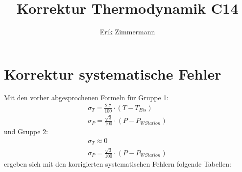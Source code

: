 \documentclass[10pt,a4paper]{article}
\title{Korrektur Thermodynamik C14}
\author{Erik Zimmermann}
\begin{document}
\maketitle
\newpage
\section{Korrektur systematische Fehler}
Mit den vorher abgesprochenen Formeln für Gruppe 1:
\begin{align}
\sigma_T=\frac{2.7}{100}\cdot (T-T_{Eis})\\
\sigma_P=\frac{\sqrt{3}}{100}\cdot (P-P_{WStation})
\end{align}
und Gruppe 2:
\begin{align}
\sigma_T\approx 0\\
\sigma_P=\frac{\sqrt{3}}{100}\cdot (P-P_{WStation})
\end{align}
ergeben sich mit den korrigierten systematischen Fehlern folgende Tabellen:
\end{document}
